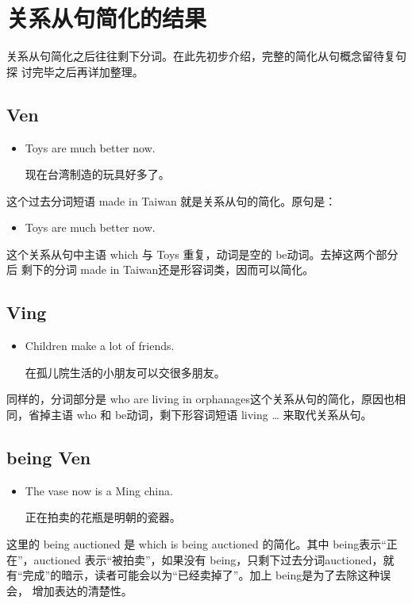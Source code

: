 \section{关系从句简化的结果}

关系从句简化之后往往剩下分词。在此先初步介绍，完整的简化从句概念留待复句探
讨完毕之后再详加整理。

\subsection{Ven}

\begin{itemize}
\item  Toys  are much better now.

  现在台湾制造的玩具好多了。
\end{itemize}
这个过去分词短语 made in Taiwan 就是关系从句的简化。原句是：
\begin{itemize}
\item  Toys  are much better now.
\end{itemize}
这个关系从句中主语 which 与 Toys 重复，动词是空的 be动词。去掉这两个部分后
剩下的分词 made in Taiwan还是形容词类，因而可以简化。

\subsection{Ving}

\begin{itemize}
\item  Children  make a lot of friends.

  在孤儿院生活的小朋友可以交很多朋友。
\end{itemize}
同样的，分词部分是 who are living in orphanages这个关系从句的简化，原因也相
同，省掉主语 who 和 be动词，剩下形容词短语 living \ldots{} 来取代关系从句。

\subsection{being Ven}

\begin{itemize}
\item  The vase  now is a Ming china.

  正在拍卖的花瓶是明朝的瓷器。
\end{itemize}
这里的 being auctioned 是 which is being auctioned 的简化。其中 being表示“正
在”，auctioned 表示“被拍卖”，如果没有 being，只剩下过去分词auctioned，就
有“完成”的暗示，读者可能会以为“已经卖掉了”。加上 being是为了去除这种误会，
增加表达的清楚性。

